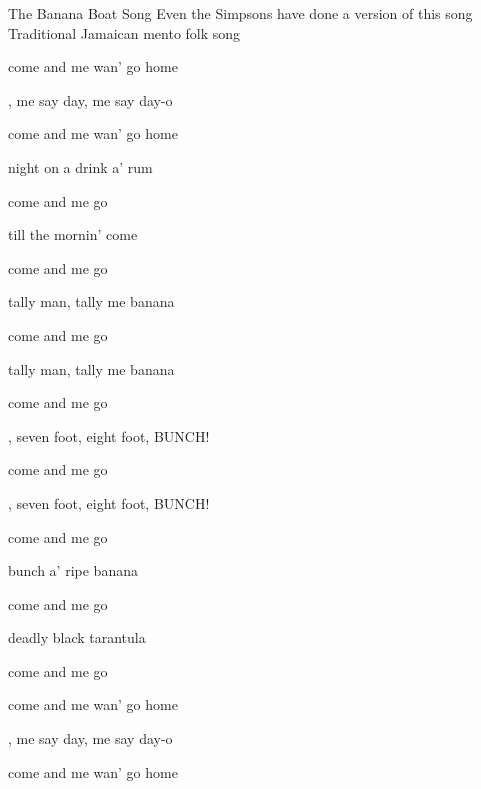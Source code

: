 \begin{SBSong}{The Banana Boat Song}
  {Even the Simpsons have done a version of this song}
  {Traditional Jamaican mento folk song}
  \begin{SBVerse}

     come and me wan' go home
    
    , me say day, me say day-o

     come and me wan' go home
  \end{SBVerse}
  \begin{SBVerse}
     night on a drink a' rum

     come and me  go 
    
     till the mornin' come

     come and me  go 
  \end{SBVerse}
  
  \begin{SBVerse}
     tally man, tally me banana

     come and me  go 
    
     tally man, tally me banana

     come and me  go 
  \end{SBVerse}
  \begin{SBVerse}
    , seven foot, eight foot, BUNCH!

     come and me  go 
    
    , seven foot, eight foot, BUNCH!

     come and me  go 
  \end{SBVerse}
  \begin{SBVerse} 
     bunch a' ripe banana

     come and me  go 

     deadly black tarantula

     come and me  go 
  \end{SBVerse}
  \begin{SBVerse}

     come and me wan' go home
    
    , me say day, me say day-o

     come and me wan' go home
  \end{SBVerse}
\end{SBSong}
  
